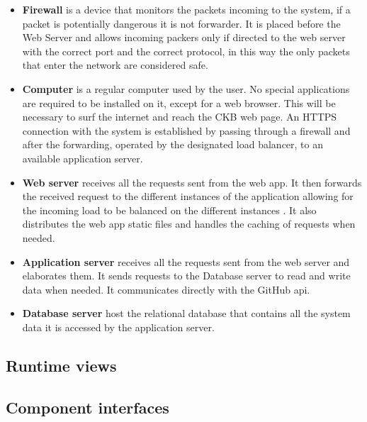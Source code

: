 \documentclass{article}
\begin{document}
\begin{itemize}
\item \textbf{Firewall} is a device that monitors the packets incoming to the system, if a packet is potentially dangerous it is not forwarder. It is placed before the Web Server and allows incoming packers only if directed to the web server with the correct port and the correct protocol, in this way the only packets that enter the network are considered safe.
\item \textbf{Computer} is a regular computer used by the user. No special applications are required to be installed on it, except for a web browser. This will be necessary to surf the internet and reach the CKB web page. An HTTPS connection with the system is established by passing through a firewall and after the forwarding, operated by the designated load balancer, to an available application server. 
\item \textbf{Web server} receives all the requests sent from the web app. It then forwards the received request to the different instances of the application allowing for the incoming load to be balanced on the different instances . It also distributes the web app static files and handles the caching of requests when needed.
\item \textbf{Application server} receives all the requests sent from the web server and elaborates them. It sends requests to the Database server to read and write data when needed. It communicates directly with the GitHub api.
\item \textbf{Database server} host the relational database that contains all the system data it is accessed by the application server.
\end{itemize}

\subsection{Runtime views}

\subsection{Component interfaces}
\end{document}
